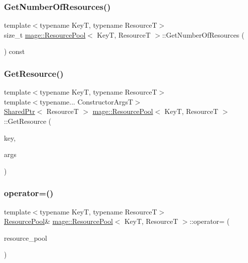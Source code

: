 \subsubsection{\texorpdfstring{Get\+Number\+Of\+Resources()}{GetNumberOfResources()}}
{\footnotesize\ttfamily template$<$typename KeyT, typename ResourceT$>$ \\
size\+\_\+t \hyperlink{classmage_1_1_resource_pool}{mage\+::\+Resource\+Pool}$<$ KeyT, ResourceT $>$\+::Get\+Number\+Of\+Resources (\begin{DoxyParamCaption}{ }\end{DoxyParamCaption}) const}

\hypertarget{classmage_1_1_resource_pool_add76506394983fe84bc2cb95cfd5f7e2}{}\label{classmage_1_1_resource_pool_add76506394983fe84bc2cb95cfd5f7e2} 
\subsubsection{\texorpdfstring{Get\+Resource()}{GetResource()}}
{\footnotesize\ttfamily template$<$typename KeyT, typename ResourceT$>$ \\
template$<$typename... Constructor\+ArgsT$>$ \\
\hyperlink{namespacemage_a1e01ae66713838a7a67d30e44c67703e}{Shared\+Ptr}$<$ ResourceT $>$ \hyperlink{classmage_1_1_resource_pool}{mage\+::\+Resource\+Pool}$<$ KeyT, ResourceT $>$\+::Get\+Resource (\begin{DoxyParamCaption}\item[{KeyT}]{key,  }\item[{Constructor\+ArgsT \&\&...}]{args }\end{DoxyParamCaption})}

\hypertarget{classmage_1_1_resource_pool_ae8121e031efe9f98605e478b01b19d33}{}\label{classmage_1_1_resource_pool_ae8121e031efe9f98605e478b01b19d33} 
\subsubsection{\texorpdfstring{operator=()}{operator=()}\hspace{0.1cm}{\footnotesize\ttfamily [1/2]}}
{\footnotesize\ttfamily template$<$typename KeyT, typename ResourceT$>$ \\
\hyperlink{classmage_1_1_resource_pool}{Resource\+Pool}\& \hyperlink{classmage_1_1_resource_pool}{mage\+::\+Resource\+Pool}$<$ KeyT, ResourceT $>$\+::operator= (\begin{DoxyParamCaption}\item[{const \hyperlink{classmage_1_1_resource_pool}{Resource\+Pool}$<$ KeyT, ResourceT $>$ \&}]{resource\+\_\+pool }\end{DoxyParamCaption})\hspace{0.3cm}{\ttfamily [delete]}}

